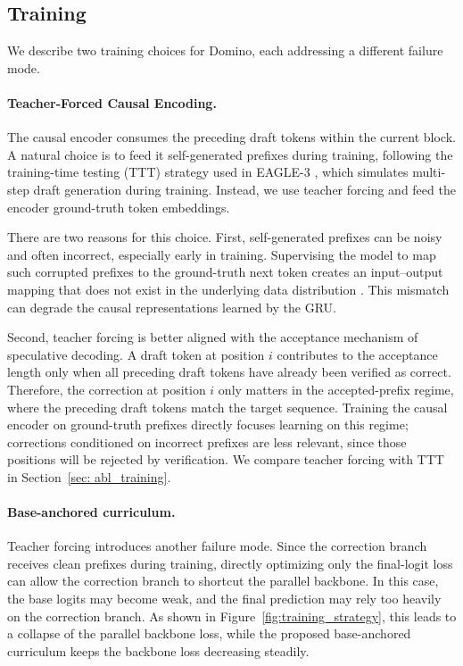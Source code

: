 \subsection{Training}
\label{sec:training}
We describe two training choices for Domino, each addressing a different failure mode.
\paragraph{Teacher-Forced Causal Encoding.}
The causal encoder consumes the preceding draft tokens within the current block. A natural choice is to feed it self-generated prefixes during training, following the training-time testing (TTT) strategy used in EAGLE-3 \citep{li2025eagle3}, which simulates multi-step draft generation during training. Instead, we use teacher forcing and feed the encoder ground-truth token embeddings.

There are two reasons for this choice. First, self-generated prefixes can be noisy and often incorrect, especially early in training. Supervising the model to map such corrupted prefixes to the ground-truth next token creates an input--output mapping that does not exist in the underlying data distribution \citep{huszar2015not}. This mismatch can degrade the causal representations learned by the GRU.

Second, teacher forcing is better aligned with the acceptance mechanism of speculative decoding. A draft token at position \(i\) contributes to the acceptance length only when all preceding draft tokens have already been verified as correct. Therefore, the correction at position \(i\) only matters in the accepted-prefix regime, where the preceding draft tokens match the target sequence. Training the causal encoder on ground-truth prefixes directly focuses learning on this regime; corrections conditioned on incorrect prefixes are less relevant, since those positions will be rejected by verification. We compare teacher forcing with TTT in Section~\ref{sec: abl_training}.

\paragraph{Base-anchored curriculum.}
Teacher forcing introduces another failure mode. Since the correction branch receives clean prefixes during training, directly optimizing only the final-logit loss can allow the correction branch to shortcut the parallel backbone. In this case, the base logits may become weak, and the final prediction may rely too heavily on the correction branch. As shown in Figure~\ref{fig:training_strategy}, this leads to a collapse of the parallel backbone loss, while the proposed base-anchored curriculum keeps the backbone loss decreasing steadily.

